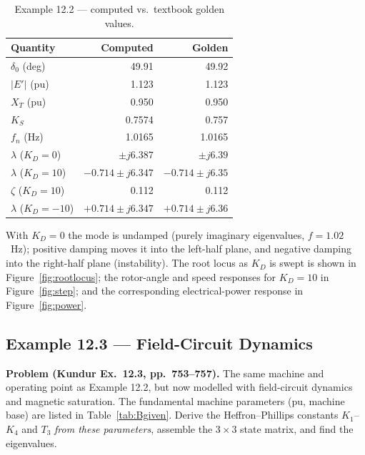 \documentclass[12pt,a4paper]{article}
\begin{document}
\begin{table}[H]
\centering
\caption{Example 12.2 --- computed vs.\ textbook golden values.}
\label{tab:modelA}
\begin{tabular}{@{}lrr@{}}
\toprule
Quantity & Computed & Golden \\
\midrule
$\delta_0$ (deg)        & 49.91 & 49.92 \\
$|E'|$ (pu)             & 1.123 & 1.123 \\
$X_T$ (pu)              & 0.950 & 0.950 \\
$K_S$                   & 0.7574 & 0.757 \\
$f_n$ (Hz)              & 1.0165 & 1.0165 \\
$\lambda$ ($K_D{=}0$)   & $\pm j6.387$ & $\pm j6.39$ \\
$\lambda$ ($K_D{=}10$)  & $-0.714\pm j6.347$ & $-0.714\pm j6.35$ \\
$\zeta$ ($K_D{=}10$)    & 0.112 & 0.112 \\
$\lambda$ ($K_D{=}{-}10$) & $+0.714\pm j6.347$ & $+0.714\pm j6.36$ \\
\bottomrule
\end{tabular}
\end{table}

With $K_D=0$ the mode is undamped (purely imaginary eigenvalues, $f=1.02$~Hz);
positive damping moves it into the left-half plane, and negative damping into
the right-half plane (instability). The root locus as $K_D$ is swept is shown in
Figure~\ref{fig:rootlocus}; the rotor-angle and speed responses for $K_D=10$ in
Figure~\ref{fig:step}; and the corresponding electrical-power response in
Figure~\ref{fig:power}.

\subsection{Example 12.3 --- Field-Circuit Dynamics}

\textbf{Problem (Kundur Ex.\ 12.3, pp.\ 753--757).} The same machine and
operating point as Example 12.2, but now modelled with field-circuit dynamics
and magnetic saturation. The fundamental machine parameters (pu, machine base)
are listed in Table~\ref{tab:Bgiven}. Derive the Heffron--Phillips constants
$K_1$--$K_4$ and $T_3$ \emph{from these parameters}, assemble the $3\times3$
state matrix, and find the eigenvalues.
\end{document}
